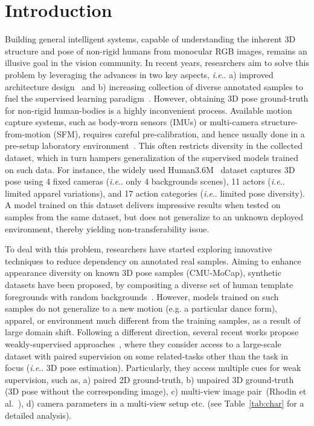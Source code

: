 \documentclass[letterpaper]{article} \usepackage{aaai20}  \usepackage{times}  \usepackage{helvet}  \usepackage{courier}  \usepackage{url}  \usepackage{graphicx}  \usepackage{amsmath}
\makeatletter
\DeclareRobustCommand\onedot{\futurelet\@let@token\@onedot}
\def\@onedot{\ifx\@let@token.\else.\null\fi\xspace}
\def\ie{\emph{i.e}\onedot} \def\Ie{\emph{I.e}\onedot}
\makeatother
\begin{document}
\section{Introduction}
Building general intelligent systems, capable of understanding the inherent 3D structure and pose of non-rigid humans from monocular RGB images, remains an illusive goal in the vision community.
In recent years, researchers aim to solve this problem by leveraging the advances in two key aspects, \ie a) improved architecture design~\cite{newell2016stacked,chu2017multi} and b) increasing collection of diverse annotated samples to fuel the supervised learning paradigm~\cite{VNect_SIGGRAPH2017}.
However, obtaining 3D pose ground-truth for non-rigid human-bodies is a highly inconvenient process. Available motion capture systems, such as body-worn sensors (IMUs) or multi-camera structure-from-motion (SFM), requires careful pre-calibration, and hence usually done in a pre-setup laboratory environment~\cite{ionescu2013human3,zhang2017martial}. 
This often restricts diversity in the collected dataset, which in turn hampers generalization of the supervised models trained on such data. For instance, the widely used Human3.6M~\cite{ionescu2013human3} dataset captures 3D pose using 4 fixed cameras (\ie only 4 backgrounds scenes), 11 actors (\ie limited apparel variations), and 17 action categories (\ie limited pose diversity). A model trained on this dataset delivers impressive results when tested on samples from the same dataset, but does not generalize to an unknown deployed environment, thereby yielding non-transferability issue. 


To deal with this problem, researchers have started exploring innovative techniques to reduce dependency on annotated real samples. Aiming to enhance appearance diversity on known 3D pose samples (CMU-MoCap), synthetic datasets have been proposed, by compositing a diverse set of human template foregrounds with random backgrounds~\cite{varol2017learning}. However, models trained on such samples do not generalize to a new motion (e.g. a particular dance form), apparel, or environment much different from the training samples, as a result of large domain shift. Following a different direction, several recent works propose weakly-supervised approaches~\cite{zhou2017towards}, where they consider access to a large-scale dataset with paired supervision on some related-tasks other than the task in focus (\ie 3D pose estimation). Particularly, they access multiple cues for weak supervision, such as, a) paired 2D ground-truth, b) unpaired 3D ground-truth (3D pose without the corresponding image), c) multi-view image pair~({\color{coolblack}Rhodin et al.~\citeyear{rhodin2018unsupervised}}), d) camera parameters in a multi-view setup etc. (see Table~\ref{tab:char} for a detailed analysis).
\end{document}
